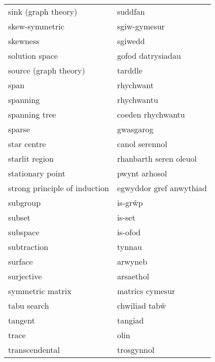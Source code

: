 \begin{supertabular}{p{0.22\textwidth}p{0.22\textwidth}}
              sink (graph theory) &                          suddfan \\
                   skew-symmetric &                     sgiw-gymesur \\
                         skewness &                          sgiwedd \\
                   solution space &                gofod datrysiadau \\
            source (graph theory) &                          tarddle \\
                             span &                        rhychwant \\
                         spanning &                       rhychwantu \\
                    spanning tree &                coeden rhychwantu \\
                           sparse &                        gwasgarog \\
                      star centre &                   canol serennol \\
                   starlit region &           rhanbarth seren oleuol \\
                 stationary point &                    pwynt arhosol \\
    strong principle of induction &          egwyddor gref anwythiad \\
                         subgroup &                          is-grŵp \\
                           subset &                           is-set \\
                         subspace &                          is-ofod \\
                      subtraction &                           tynnau \\
                          surface &                          arwyneb \\
                       surjective &                        arsaethol \\
                 symmetric matrix &                  matrics cymesur \\
                      tabu search &                    chwiliad tabŵ \\
                          tangent &                          tangiad \\
                            trace &                             olin \\
                   transcendental &                       trosgynnol \\

\end{supertabular}
